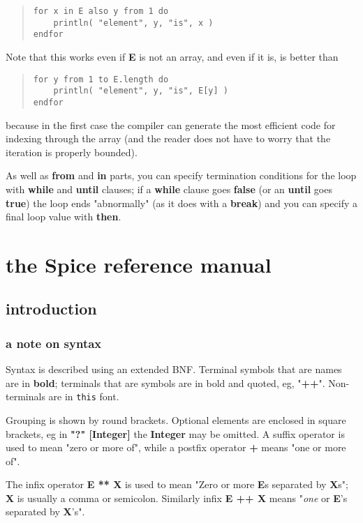 \documentclass{report}
\begin{document}
\begin{quote}
\begin{verbatim}
for x in E also y from 1 do
    println( "element", y, "is", x )
endfor
\end{verbatim}
\end{quote}
Note that this works even if {\bf E} is not an array, and even if it is, is better
than

\begin{quote}
\begin{verbatim}
for y from 1 to E.length do
    println( "element", y, "is", E[y] )
endfor
\end{verbatim}
\end{quote}
because in the first case the compiler can generate the most efficient code
for indexing through the array (and the reader does not have to worry that
the iteration is properly bounded).

As well as {\bf from} and {\bf in} parts, you can specify termination conditions for
the loop with {\bf while} and {\bf until} clauses; if a {\bf while} clause goes {\bf false}
(or an {\bf until} goes {\bf true}) the loop ends "abnormally" (as it does with a
{\bf break}) and you can specify a final loop value with {\bf then}.



\part{the Spice reference manual}
\chapter{introduction}


\section{a note on syntax}


Syntax is described using an extended BNF. Terminal symbols that are names are
in {\bf bold}; terminals that are symbols are in bold and quoted, eg, "{\bf ++}".
Non-terminals are in {\tt this} font.

Grouping is shown by round brackets. Optional elements are enclosed in square
brackets, eg in {\bf "?" {[}Integer{]}} the {\bf Integer} may be omitted. A suffix
operator {\bf *} is used to mean "zero or more of", while a postfix operator {\bf +}
means "one or more of".

The infix operator {\bf E ** X} is used to mean "Zero or more {\bf E}s separated by
{\bf X}s"; {\bf X} is usually a comma or semicolon. Similarly infix {\bf E ++ X} means
"{\em one} or {\bf E}'s separated by {\bf X}'s".
\end{document}
